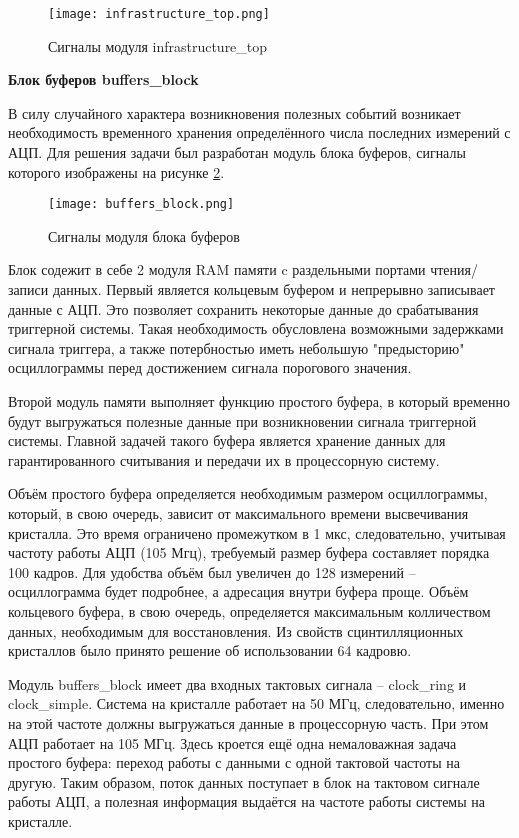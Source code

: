 \begin{figure}[ht]
    \centering
    \texttt{[image: infrastructure\_top.png]}
    \caption{Сигналы модуля infrastructure\_top}
    \label{fig:infrastructure_top}
\end{figure}
\textbf{Блок буферов buffers\_block}\par
В силу случайного характера возникновения полезных событий возникает необходимость временного хранения определённого числа последних измерений с АЦП. Для решения задачи был разработан модуль блока буферов, сигналы которого изображены на рисунке \ref{fig:buffers_block}.\par
\begin{figure}[ht]
    \centering
    \texttt{[image: buffers\_block.png]}
    \caption{Сигналы модуля блока буферов}
    \label{fig:buffers_block}
\end{figure}
Блок содежит в себе 2 модуля RAM памяти c раздельными портами чтения/записи данных. Первый является кольцевым буфером и непрерывно записывает данные с АЦП. Это позволяет сохранить некоторые данные до срабатывания триггерной системы. Такая необходимость обусловлена возможными задержками сигнала триггера, а также потербностью иметь небольшую "предысторию" осциллограммы перед достижением сигнала порогового значения.\par
Второй модуль памяти выполняет функцию простого буфера, в который временно будут выгружаться полезные данные при возникновении сигнала триггерной системы. Главной задачей такого буфера является хранение данных для гарантированного считывания и передачи их в процессорную систему.\par
Объём простого буфера определяется необходимым размером осциллограммы, который, в свою очередь, зависит от максимального времени высвечивания кристалла. Это время ограничено промежутком в 1 мкс, следовательно, учитывая частоту работы АЦП (105 Мгц), требуемый размер буфера составляет порядка 100 кадров. Для удобства объём был увеличен до 128 измерений -- осциллограмма будет подробнее, а адресация внутри буфера проще. Объём кольцевого буфера, в свою очередь, определяется максимальным колличеством данных, необходимым для восстановления. Из свойств сцинтилляционных кристаллов было принято решение об использовании 64 кадровю.\par
Модуль buffers\_block имеет два входных тактовых сигнала -- clock\_ring и clock\_simple. Система на кристалле работает на 50 МГц, следовательно, именно на этой частоте должны выгружаться данные в процессорную часть. При этом АЦП работает на 105 МГц. Здесь кроется ещё одна немаловажная задача простого буфера: переход работы с данными с одной тактовой частоты на другую. Таким образом, поток данных поступает в блок на тактовом сигнале работы АЦП, а полезная информация выдаётся на частоте работы системы на кристалле.\par
